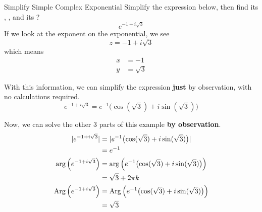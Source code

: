 \begin{example}[Lecture 3]{Simplify Simple Complex Exponential}
  Simplify the expression below, then find its , , and its ?
  \begin{equation*}
    e^{-1 + i\sqrt{3}}
  \end{equation*}
  \tcblower{}
  If we look at the exponent on the exponential, we see
  \begin{equation*}
    z = -1 + i\sqrt{3}
  \end{equation*}
  which means
  \begin{align*}
    x &= -1 \\
    y &= \sqrt{3}
  \end{align*}

  With this information, we can simplify the expression \textbf{just} by observation, with no calculations required.
  \begin{equation*}
    e^{-1 + i\sqrt{3}} = e^{-1} \bigl( \cos(\sqrt{3}) + i \sin(\sqrt{3}) \bigr)
  \end{equation*}

  Now, we can solve the other 3 parts of this example \textbf{by observation}.
  \begin{align*}
    \lvert e^{-1 + i\sqrt{3}} \rvert &= \lvert e^{-1} \bigl( \cos(\sqrt{3}) + i \sin(\sqrt{3}) \bigr) \rvert \\
                                 &= e^{-1} \\
    \arg \left( e^{-1 + i\sqrt{3}} \right) &= \arg \left( e^{-1} \bigl( \cos(\sqrt{3}) + i \sin(\sqrt{3}) \bigr) \right) \\
                                 &= \sqrt{3} + 2 \pi k \\
    \operatorname{Arg} \left( e^{-1 + i\sqrt{3}} \right) &= \operatorname{Arg} \left( e^{-1} \bigl( \cos(\sqrt{3}) + i \sin(\sqrt{3}) \bigr) \right) \\
                                 &= \sqrt{3}
  \end{align*}
\end{example}

